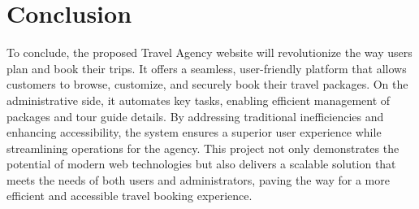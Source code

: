 \documentclass[12pt]{scrreprt}
\begin{document}
\section{Conclusion}
To conclude, the proposed Travel Agency website will revolutionize the way users plan and book their trips. It offers a seamless, user-friendly platform that allows customers to browse, customize, and securely book their travel packages. On the administrative side, it automates key tasks, enabling efficient management of packages and tour guide details.  
By addressing traditional inefficiencies and enhancing accessibility, the system ensures a superior user experience while streamlining operations for the agency. This project not only demonstrates the potential of modern web technologies but also delivers a scalable solution that meets the needs of both users and administrators, paving the way for a more efficient and accessible travel booking experience.
\end{document}
